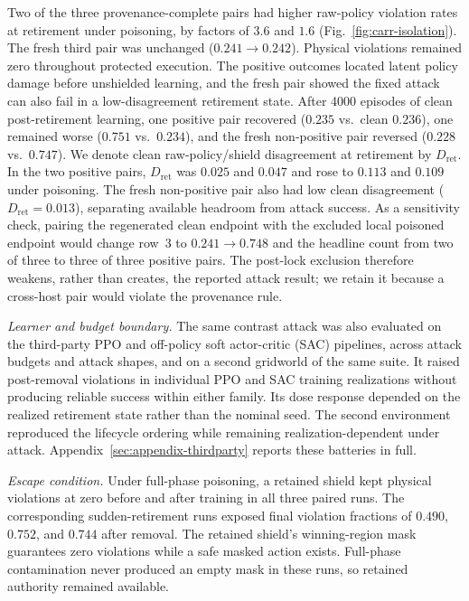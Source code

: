 Two of the three provenance-complete pairs had higher raw-policy violation
rates at retirement under poisoning, by factors of $3.6$ and $1.6$
(Fig.~\ref{fig:carr-isolation}).  The fresh
third pair was unchanged ($0.241\rightarrow0.242$).  Physical violations
remained zero throughout protected execution.  The positive outcomes located
latent policy damage before unshielded learning, and the fresh pair showed the
fixed attack can also fail in a low-disagreement retirement state.  After 4000
episodes of clean post-retirement learning, one positive pair recovered
($0.235$ vs.\ clean $0.236$), one remained worse
($0.751$ vs.\ $0.234$), and the fresh non-positive pair reversed
($0.228$ vs.\ $0.747$).  We denote clean raw-policy/shield disagreement at
retirement by $D_{\mathrm{ret}}$.  In the two positive pairs,
$D_{\mathrm{ret}}$ was $0.025$ and $0.047$ and rose to $0.113$ and $0.109$
under poisoning.  The fresh non-positive pair also had low clean disagreement
($D_{\mathrm{ret}}=0.013$), separating available headroom from attack success.
As a sensitivity check, pairing the regenerated clean endpoint with the
excluded local poisoned endpoint would change row~3 to
$0.241\rightarrow0.748$ and the headline count from two of three to three of
three positive pairs.  The post-lock exclusion therefore weakens, rather than
creates, the reported attack result; we retain it because a cross-host pair
would violate the provenance rule.

\emph{Learner and budget boundary.}
The same contrast attack was also evaluated on the third-party PPO and
off-policy soft actor-critic (SAC) pipelines, across attack budgets and
attack shapes, and on a second gridworld of the same suite.  It raised
post-removal violations in individual PPO and SAC training realizations
without producing reliable success within either family.  Its dose response
depended on the realized retirement state rather than the nominal seed.  The
second environment reproduced the lifecycle ordering while remaining
realization-dependent under attack.
Appendix~\ref{sec:appendix-thirdparty} reports these batteries in full.

\emph{Escape condition.}
Under full-phase poisoning, a retained
shield kept physical violations at zero before and after training in all three
paired runs.  The corresponding sudden-retirement runs exposed final violation
fractions of $0.490$, $0.752$, and $0.744$ after removal.  The retained
shield's winning-region mask guarantees zero violations while a safe masked
action exists.  Full-phase contamination never produced an empty mask in these
runs, so retained authority remained available.

